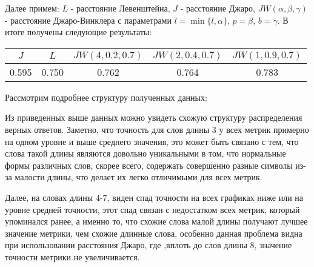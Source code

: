 \documentclass[12pt, a4paper]{article}
\begin{document}
Далее примем: $L$ - расстояние Левенштейна, $J$ - расстояние Джаро, $JW(\alpha, \beta, \gamma)$ - расстояние Джаро-Винклера с параметрами $l=\min\{l, \alpha\}$, $p=\beta$, $b=\gamma$. В итоге получены следующие результаты:

\begin{center}
\begin{tabular}{ |c|c|c|c|c| } 
\hline
$J$ & $L$ & $JW(4, 0.2, 0.7)$ & $JW(2, 0.4, 0.7)$ & $JW(1, 0.9, 0.7)$ \\ 
\hline
0.595 & 0.750 & 0.762 & 0.764 & 0.783 \\
\hline
\end{tabular}
\end{center}

Рассмотрим подробнее структуру полученных данных:

\begin{figure}[htbp]
\label{ris:Jaro.png}
\end{figure}

\begin{figure}[htbp]
\label{ris:Jaro-Winkler.png}
\end{figure}

\newpage

\begin{figure}[htp]
\label{ris:Levenshtein.png}
\end{figure}

Из приведенных выше данных можно увидеть схожую структуру распределения верных ответов. Заметно, что точность для слов длины 3 у всех метрик примерно на одном уровне и выше среднего значения, это может быть связано с тем, что слова такой длины являются довольно уникальными в том, что нормальные формы различных слов, скорее всего, содержать совершенно разные символы из-за малости длины, что делает их легко отличимыми для всех метрик. 

Далее, на словах длины 4-7, виден спад точности на всех графиках ниже или на уровне средней точности, этот спад связан с недостатком всех метрик, который упоминался ранее, а именно то, что схожие слова малой длины получают лучшее значение метрики, чем схожие длинные слова, особенно данная проблема видна при использовании расстояния Джаро, где ,вплоть до слов длины 8, значение точности метрики не увеличивается.
\end{document}
